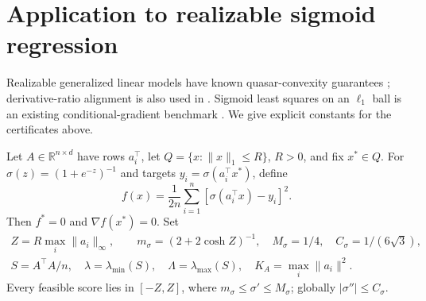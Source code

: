 \section{Application to realizable sigmoid regression}
\label{reg:sigmoid}
Realizable generalized linear models have known quasar-convexity
guarantees \cite[Lemma 3]{regglm}; derivative-ratio alignment is also
used in \cite[Lemma 5]{regfoster}. Sigmoid least squares on an
$\ell_1$ ball is an existing conditional-gradient benchmark
\cite[Section 5.1.4]{khademi}. We give explicit constants for the
certificates above.

Let $A\in\mathbb R^{n\times d}$ have rows $a_i^\top$, let
$Q=\{x:\|x\|_1\le R\}$, $R>0$, and fix $x^*\in Q$.
For $\sigma(z)=(1+e^{-z})^{-1}$ and targets
$y_i=\sigma(a_i^\top x^*)$, define
\begin{equation}\label{reg:sigmoidloss}
 f(x)=\frac1{2n}\sum_{i=1}^n[\sigma(a_i^\top x)-y_i]^2.
\end{equation}
Then $f^*=0$ and $\nabla f(x^*)=0$. Set
\[
 \begin{gathered}
 Z=R\max_i\|a_i\|_\infty,\qquad
 m_\sigma=(2+2\cosh Z)^{-1},\quad
 M_\sigma=1/4,\quad C_\sigma=1/(6\sqrt3),\\
 S=A^\top A/n,\quad \lambda=\lambda_{\min}(S),\quad
 \Lambda=\lambda_{\max}(S),\quad K_A=\max_i\|a_i\|^2.
 \end{gathered}
\]
Every feasible score lies in $[-Z,Z]$, where
$m_\sigma\le\sigma'\le M_\sigma$; globally $|\sigma''|\le C_\sigma$.

